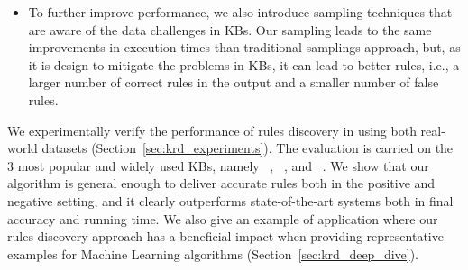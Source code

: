 \begin{itemize}
\item To further improve performance, we also introduce sampling techniques that are aware of the data challenges in KBs. Our sampling leads to the same improvements in execution times than traditional samplings approach, but, as it is design to mitigate the problems in KBs, it can lead to better rules, i.e., a larger number of correct rules in the output and a smaller number of false rules.

\end{itemize}


We experimentally verify the performance of rules discovery in \krd using both real-world datasets (Section~\ref{sec:krd_experiments}). The evaluation is carried on the 3 most popular and widely used KBs, namely \dbpedia~\cite{bizer2009dbpedia}, \yago~\cite{suchanek2007yago}, and \wikidata~\cite{vrandevcic2014wikidata}. We show that our algorithm is general enough to deliver accurate rules both in the positive and negative setting, and it clearly outperforms state-of-the-art systems both in final accuracy and running time. We also give an example of application where our rules discovery approach has a beneficial impact when providing representative examples for Machine Learning algorithms (Section~\ref{sec:krd_deep_dive}).